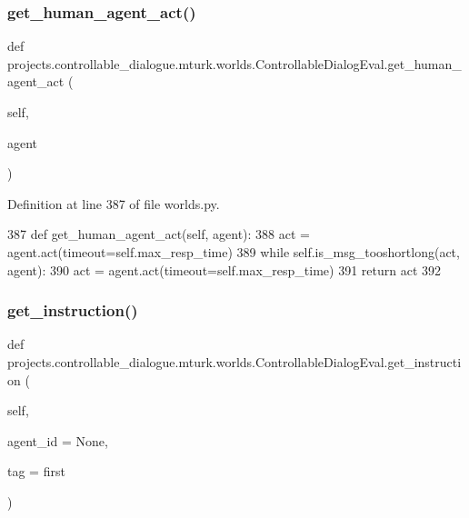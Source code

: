 \subsubsection{\texorpdfstring{get\+\_\+human\+\_\+agent\+\_\+act()}{get\_human\_agent\_act()}}
{\footnotesize\ttfamily def projects.\+controllable\+\_\+dialogue.\+mturk.\+worlds.\+Controllable\+Dialog\+Eval.\+get\+\_\+human\+\_\+agent\+\_\+act (\begin{DoxyParamCaption}\item[{}]{self,  }\item[{}]{agent }\end{DoxyParamCaption})}



Definition at line 387 of file worlds.\+py.


\begin{DoxyCode}
387     \textcolor{keyword}{def }get\_human\_agent\_act(self, agent):
388         act = agent.act(timeout=self.max\_resp\_time)
389         \textcolor{keywordflow}{while} self.is\_msg\_tooshortlong(act, agent):
390             act = agent.act(timeout=self.max\_resp\_time)
391         \textcolor{keywordflow}{return} act
392 
\end{DoxyCode}
\mbox{\label{classprojects_1_1controllable__dialogue_1_1mturk_1_1worlds_1_1ControllableDialogEval_a787f3ae4c9c8e8ec24139a9fa39792b2}} 
\subsubsection{\texorpdfstring{get\+\_\+instruction()}{get\_instruction()}}
{\footnotesize\ttfamily def projects.\+controllable\+\_\+dialogue.\+mturk.\+worlds.\+Controllable\+Dialog\+Eval.\+get\+\_\+instruction (\begin{DoxyParamCaption}\item[{}]{self,  }\item[{}]{agent\+\_\+id = {\ttfamily None},  }\item[{}]{tag = {\ttfamily \textquotesingle{}first\textquotesingle{}} }\end{DoxyParamCaption})}



